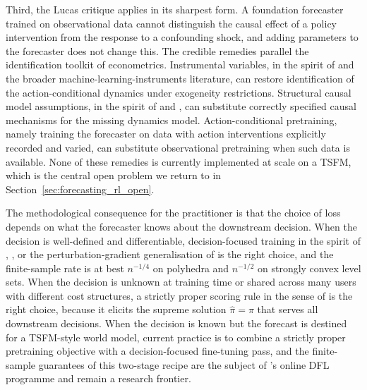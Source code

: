 Third, the Lucas critique applies in its sharpest form. A foundation forecaster
trained on observational data cannot distinguish the causal effect of a policy
intervention from the response to a confounding shock, and adding parameters
to the forecaster does not change this. The credible remedies parallel the
identification toolkit of econometrics. Instrumental variables, in the spirit
of \citet{Chernozhukov2018} and the broader machine-learning-instruments
literature, can restore identification of the action-conditional dynamics
under exogeneity restrictions. Structural causal model assumptions, in the
spirit of \citet{Buesing2019} and \citet{Oberst2019}, can substitute correctly
specified causal mechanisms for the missing dynamics model. Action-conditional
pretraining, namely training the forecaster on data with action interventions
explicitly recorded and varied, can substitute observational pretraining when
such data is available. None of these remedies is currently implemented at
scale on a TSFM, which is the central open problem we return to in
Section~\ref{sec:forecasting_rl_open}.

The methodological consequence for the practitioner is that the choice of loss
depends on what the forecaster knows about the downstream decision. When the
decision is well-defined and differentiable, decision-focused training in the
spirit of \citet{ElmachtoubGrigas2022}, \citet{DontiAmosKolter2017}, or the
perturbation-gradient generalisation of \citet{HuangGupta2024} is the right
choice, and the finite-sample rate is at best $n^{-1/4}$ on polyhedra and
$n^{-1/2}$ on strongly convex level sets. When the decision is unknown at
training time or shared across many users with different cost structures, a
strictly proper scoring rule in the sense of \citet{GneitingRaftery2007} is
the right choice, because it elicits the supreme solution
$\hat\pi = \pi$ that serves all downstream decisions. When the decision is
known but the forecast is destined for a TSFM-style world model, current
practice is to combine a strictly proper pretraining objective with a
decision-focused fine-tuning pass, and the finite-sample guarantees of this
two-stage recipe are the subject of \citet{Capitaine2025}'s online
DFL programme and remain a research frontier.
